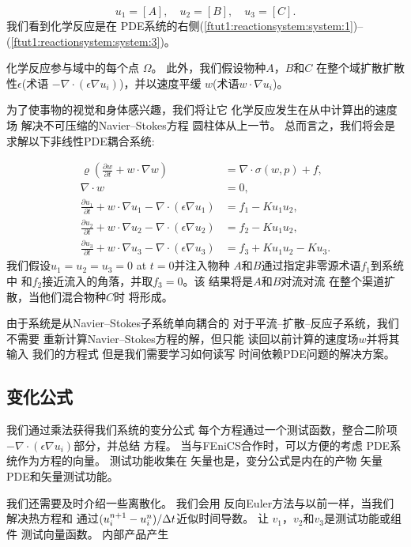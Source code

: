 \[
  u_1 = [A], \quad u_2 = [B], \quad u_3 = [C].
\]
我们看到化学反应是在
PDE系统的右侧(\ref{ftut1:reactionsystem:system:1})--(\ref{ftut1:reactionsystem:system:3})。

化学反应参与域中的每个点
$\Omega$。 此外，我们假设物种$A$，$B$和$C$
在整个域扩散扩散性$\epsilon$(术语
$-\nabla\cdot(\epsilon\nabla u_i)$)，并以速度平缓
$w$(术语$w\cdot\nabla u_i$)。

为了使事物的视觉和身体感兴趣，我们将让它
化学反应发生在从中计算出的速度场
解决不可压缩的Navier--Stokes方程
圆柱体从上一节。 总而言之，我们将会是
求解以下非线性PDE耦合系统:

\begin{align}
  \label{ftut1:reactionsystem:full}
  \varrho\left(\frac{\partial w}{\partial t} +
  w \cdot \nabla w\right) &= \nabla\cdot\sigma(w, p) + f, \\
  \nabla \cdot w &= 0, \\
  \frac{\partial u_1}{\partial t} +
  w \cdot \nabla u_1 - \nabla\cdot(\epsilon\nabla u_1)
    &= f_1 - K u_1 u_2, \\
  \frac{\partial u_2}{\partial t} +
  w \cdot \nabla u_2 - \nabla\cdot(\epsilon\nabla u_2)
    &= f_2 - K u_1 u_2, \\
  \frac{\partial u_3}{\partial t} +
  w \cdot \nabla u_3 - \nabla\cdot(\epsilon\nabla u_3)
    &= f_3 + K u_1 u_2 - K u_3.
\end{align}
我们假设$u_1 = u_2 = u_3 = 0$ at $t = 0$并注入物种
$A$和$B$通过指定非零源术语$f_1$到系统中
和$f_2$接近流入的角落，并取$f_3 = 0$。该
结果将是$A$和$B$对流对流
在整个渠道扩散，当他们混合物种$C$时
将形成。

由于系统是从Navier--Stokes子系统单向耦合的
对于平流--扩散--反应子系统，我们不需要
重新计算Navier--Stokes方程的解，但只能
读回以前计算的速度场$w$并将其输入
我们的方程式 但是我们需要学习如何读写
时间依赖PDE问题的解决方案。

\subsection{变化公式}

我们通过乘法获得我们系统的变分公式
每个方程通过一个测试函数，整合二阶项
$-\nabla\cdot(\epsilon\nabla u_i)$部分，并总结
方程。 当与FEniCS合作时，可以方便的考虑
PDE系统作为方程的向量。 测试功能收集在
矢量也是，变分公式是内在的产物
矢量PDE和矢量测试功能。

我们还需要及时介绍一些离散化。 我们会用
反向Euler方法与以前一样，当我们解决热方程和
通过$(u_i^{n+1}-u_i^n) / \Delta t$近似时间导数。 让
$v_1$，$v_2$和$v_3$是测试功能或组件
测试向量函数。 内部产品产生

